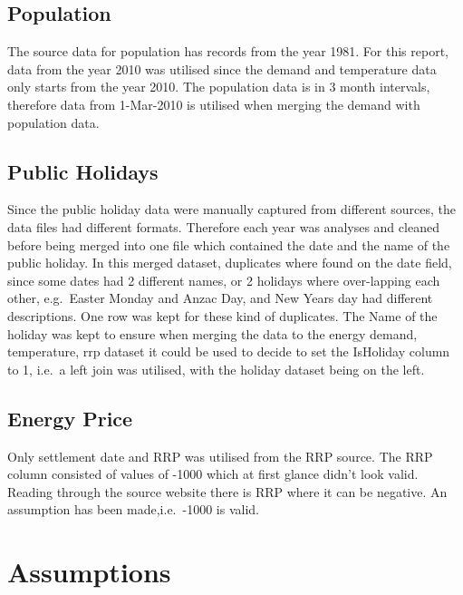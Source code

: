 \documentclass[mstat,12pt]{unswthesis}
\begin{document}
\hypertarget{population}{%
\subsection{Population}\label{population}}

The source data for population has records from the year 1981. For this
report, data from the year 2010 was utilised since the demand and
temperature data only starts from the year 2010. The population data is
in 3 month intervals, therefore data from 1-Mar-2010 is utilised when
merging the demand with population data.

\hypertarget{public-holidays}{%
\subsection{Public Holidays}\label{public-holidays}}

Since the public holiday data were manually captured from different
sources, the data files had different formats. Therefore each year was
analyses and cleaned before being merged into one file which contained
the date and the name of the public holiday. In this merged dataset,
duplicates where found on the date field, since some dates had 2
different names, or 2 holidays where over-lapping each other,
e.g.~Easter Monday and Anzac Day, and New Years day had different
descriptions. One row was kept for these kind of duplicates. The Name of
the holiday was kept to ensure when merging the data to the energy
demand, temperature, rrp dataset it could be used to decide to set the
IsHoliday column to 1, i.e.~a left join was utilised, with the holiday
dataset being on the left.

\hypertarget{energy-price}{%
\subsection{Energy Price}\label{energy-price}}

Only settlement date and RRP was utilised from the RRP source. The RRP
column consisted of values of -1000 which at first glance didn't look
valid. Reading through the source website there is RRP where it can be
negative. An assumption has been made,i.e.~-1000 is valid.

\hypertarget{assumptions}{%
\section{Assumptions}\label{assumptions}}
\end{document}
